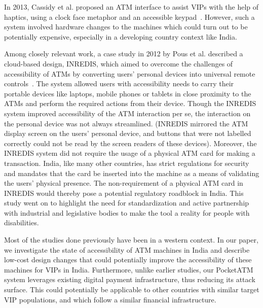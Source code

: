 In 2013, Cassidy et al. proposed an ATM interface to assist VIPs with the help of haptics, using a clock face metaphor and an accessible keypad~\cite{cassidy2013haptic}. However, such a system involved hardware changes to the machines which could turn out to be potentially expensive, especially in a developing country context like India.

Among closely relevant work, a case study in 2012 by Pous et al. described a cloud-based design, INREDIS, which aimed to overcome the challenges of accessibility of ATMs by converting users' personal devices into universal remote controls~\cite{pous2012enhancing}. The system allowed users with accessibility needs to carry their portable devices like laptops, mobile phones or tablets in close proximity to the ATMs and perform the required actions from their device. Though the INREDIS system improved accessibility of the ATM interaction per se, the interaction on the personal device was not always streamlined. (INREDIS mirrored the ATM display screen on the users' personal device, and buttons that were not labelled correctly could not be read by the screen readers of these devices). Moreover, the INREDIS system did not require the usage of a physical ATM card for making a transaction. India, like many other countries, has strict regulations for security and mandates that the card be inserted into the machine as a means of validating the users' physical presence. The non-requirement of a physical ATM card in INREDIS would thereby pose a potential regulatory roadblock in India. This study went on to highlight the need for standardization and active partnership with industrial and legislative bodies to make the tool a reality for people with disabilities.

Most of the studies done previously have been in a western context. In our paper, we investigate the state of accessibility of ATM machines in India and describe low-cost design changes that could potentially improve the accessibility of these machines for VIPs in India. Furthermore, unlike earlier studies, our PocketATM system leverages existing digital payment infrastructure, thus reducing its attack surface. This could potentially be applicable to other countries with similar target VIP populations, and which follow a similar financial infrastructure.

